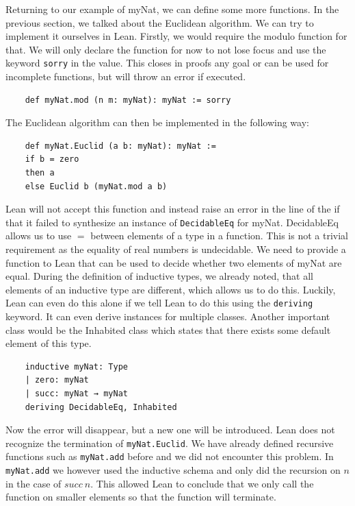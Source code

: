 Returning to our example of myNat, we can define some more functions. In the previous section, we talked about the Euclidean algorithm. We can try to implement it ourselves in Lean. Firstly, we would require the modulo function for that. We will only declare the function for now to not lose focus and use the keyword \lstinline|sorry| in the value. This closes in proofs any goal or can be used for incomplete functions, but will throw an error if executed.

\begin{lstlisting}
    def myNat.mod (n m: myNat): myNat := sorry
\end{lstlisting}

The Euclidean algorithm can then be implemented in the following way:

\begin{lstlisting}
    def myNat.Euclid (a b: myNat): myNat :=
    if b = zero
    then a
    else Euclid b (myNat.mod a b)
\end{lstlisting}

Lean will not accept this function and instead raise an error in the line of the if that it failed to synthesize an instance of \lstinline|DecidableEq| for myNat. DecidableEq allows us to use $=$ between elements of a type in a function. This is not a trivial requirement as the equality of real numbers is undecidable\cite{EqualityRealNumber}. We need to provide a function to Lean that can be used to decide whether two elements of myNat are equal. During the definition of inductive types, we already noted, that all elements of an inductive type are different, which allows us to do this. Luckily, Lean can even do this alone if we tell Lean to do this using the \lstinline|deriving| keyword. It can even derive instances for multiple classes. Another important class would be the Inhabited class which states that there exists some default element of this type.

\begin{lstlisting}
    inductive myNat: Type
    | zero: myNat
    | succ: myNat → myNat
    deriving DecidableEq, Inhabited

\end{lstlisting}

Now the error will disappear, but a new one will be introduced. Lean does not recognize the termination of \lstinline|myNat.Euclid|. We have already defined recursive functions such as \lstinline|myNat.add| before and we did not encounter this problem. In \lstinline|myNat.add| we however used the inductive schema and only did the recursion on $n$ in the case of $succ\ n$. This allowed Lean to conclude that we only call the function on smaller elements so that the function will terminate.

